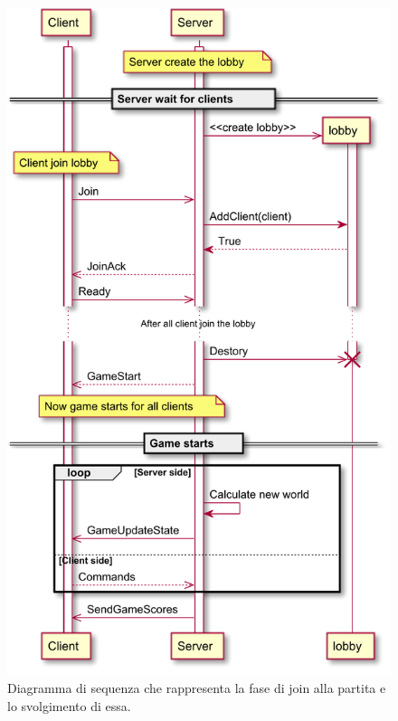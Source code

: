 \begin{figure}[H]
	\centering
	\includegraphics[width=0.99\columnwidth]{plantuml/rendered/sequenceDiagrams/sequenceClientServer.pdf}
	\caption{Diagramma di sequenza che rappresenta la fase di join alla partita e lo svolgimento di essa.}
	\label{fig:sequenceClientServer}
\end{figure}


